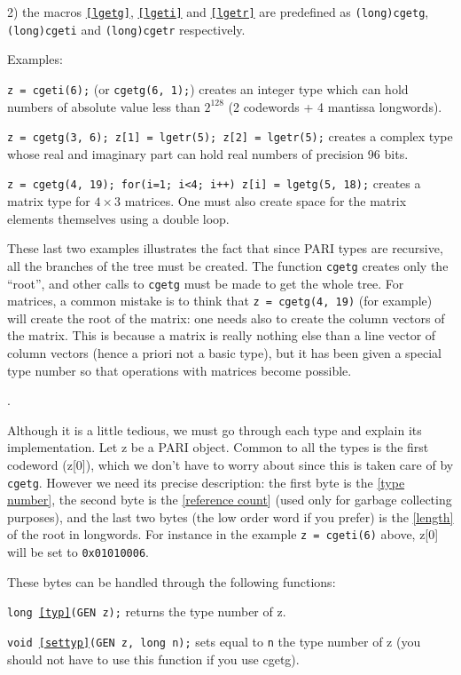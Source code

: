 2) the macros {\tt \ref{lgetg}}, {\tt \ref{lgeti}} and {\tt \ref{lgetr}} are predefined as
{\tt (long)cgetg}, {\tt (long)cgeti} and {\tt (long)cgetr} respectively.

Examples:

{\tt z = cgeti(6);} (or {\tt cgetg(6, 1);}) creates an integer type which
can hold numbers of absolute value less than $2^{128}$ (2 codewords +
4 mantissa longwords).

{\tt z = cgetg(3, 6); z[1] = lgetr(5); z[2] = lgetr(5);}
creates a complex type whose real and imaginary part can hold real numbers
of precision 96 bits.

{\tt z = cgetg(4, 19); for(i=1; i<4; i++) z[i] = lgetg(5, 18);}
creates a matrix type for $4\times 3$ matrices. One must also create space
for the matrix elements themselves using a double loop.

These last two examples illustrates the fact that since PARI types are recursive,
all the branches of the tree must be created. The function {\tt cgetg} creates only the
``root'', and other calls to {\tt cgetg} must be made to get the whole tree.
For matrices, a common mistake is to think that {\tt z = cgetg(4, 19)}
(for example) will create the root of the matrix: one needs also to create 
the column vectors of the
matrix. This is because a matrix is really nothing else than a line vector of
column vectors (hence a priori not a basic type), but it has been given a special
type number so that operations with matrices become possible.

.

Although it is a little tedious, we must go through each type and explain
its implementation. Let z be a PARI object. Common to all the types is the first
codeword (z[0]), which we don't have to worry about since this is taken care of
by {\tt cgetg}. However we need its precise description: the first
byte is the \ref{type number}, the second byte is the \ref{reference count} (used only
for garbage collecting purposes), and the last two bytes (the low order word if
you prefer) is the \ref{length} of the root in longwords. For instance in the example
{\tt z = cgeti(6)} above, z[0] will be set to {\tt 0x01010006}.

These bytes can be handled through the following functions:

{\tt long \ref{typ}(GEN z);} returns the type number of z.

{\tt void \ref{settyp}(GEN z, long n);} sets equal to {\tt n} the type number of z
(you should not have to use this function if you use cgetg).

